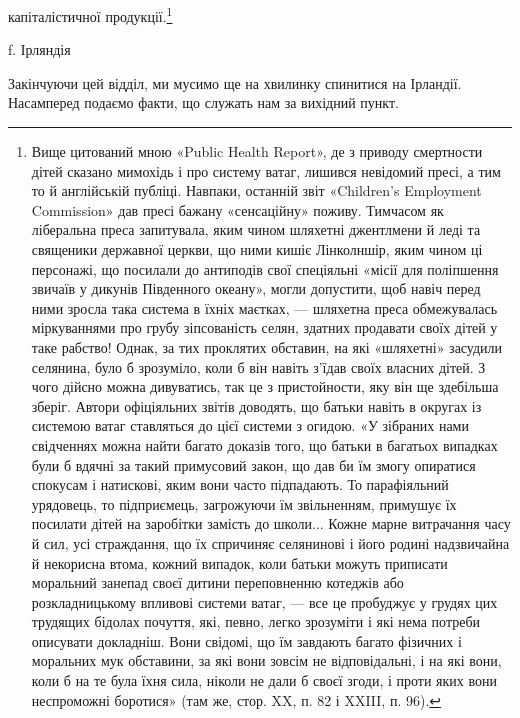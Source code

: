 капіталістичної продукції.\footnote{
Вище цитований мною «Public Health Report», де з приводу
смертности дітей сказано мимохідь і про систему ватаг, лишився невідомий
пресі, а тим то й англійській публіці. Навпаки, останній звіт «Children’s
Employment Commission» дав пресі бажану «сенсаційну» поживу.
Тимчасом як ліберальна преса запитувала, яким чином шляхетні джентлмени
й леді та священики державної церкви, що ними кишіє Лінколншір,
яким чином ці персонажі, що посилали до антиподів свої спеціяльні
«місії для поліпшення звичаїв у дикунів Південного океану», могли допустити,
щоб навіч перед ними зросла така система в їхніх маєтках, —
шляхетна преса обмежувалась міркуваннями про грубу зіпсованість
селян, здатних продавати своїх дітей у таке рабство! Однак, за тих проклятих
обставин, на які «шляхетні» засудили селянина, було б зрозуміло,
коли б він навіть з’їдав своїх власних дітей. З чого дійсно можна
дивуватись, так це з пристойности, яку він ще здебільша зберіг. Автори
офіціяльних звітів доводять, що батьки навіть в округах із системою ватаг
ставляться до цієї системи з огидою. «У зібраних нами свідченнях можна
найти багато доказів того, що батьки в багатьох випадках були б вдячні
за такий примусовий закон, що дав би їм змогу опиратися спокусам і
натискові, яким вони часто підпадають. То парафіяльний урядовець,
то підприємець, загрожуючи їм звільненням, примушує їх посилати дітей
на заробітки замість до школи... Кожне марне витрачання часу й сил,
усі страждання, що їх спричиняє селянинові і його родині надзвичайна
й некорисна втома, кожний випадок, коли батьки можуть приписати
моральний занепад своєї дитини переповненню котеджів або розкладницькому
впливові системи ватаг, — все це пробуджує у грудях цих трудящих
бідолах почуття, які, певно, легко зрозуміти і які нема потреби описувати
докладніш. Вони свідомі, що їм завдають багато фізичних і моральних
мук обставини, за які вони зовсім не відповідальні, і на які вони,
коли б на те була їхня сила, ніколи не дали б своєї згоди, і проти яких
вони неспроможні боротися» (там же, стор. XX, п. 82 і XXIII, п. 96).
}

f. Ірляндія

Закінчуючи цей відділ, ми мусимо ще на хвилинку спинитися
на Ірландії. Насамперед подаємо факти, що служать нам
за вихідний пункт.